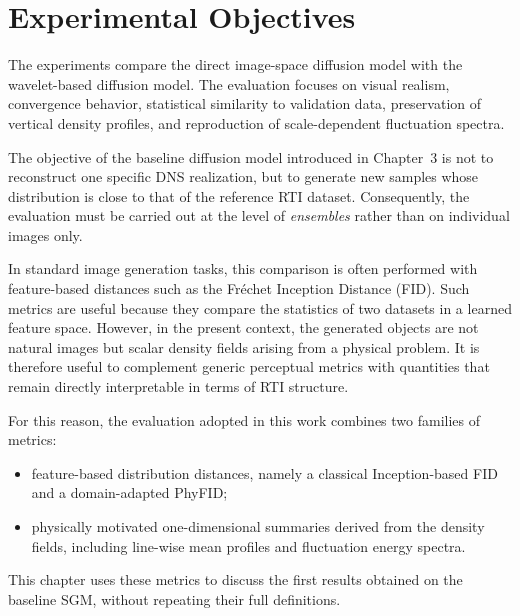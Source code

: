 \section{Experimental Objectives}

The experiments compare the direct image-space diffusion model with the wavelet-based diffusion model. The evaluation focuses on visual realism, convergence behavior, statistical similarity to validation data, preservation of vertical density profiles, and reproduction of scale-dependent fluctuation spectra.

The objective of the baseline diffusion model introduced in Chapter~3 is not to
reconstruct one specific DNS realization, but to generate new samples whose
distribution is close to that of the reference RTI dataset. Consequently, the
evaluation must be carried out at the level of \emph{ensembles} rather than on
individual images only.

In standard image generation tasks, this comparison is often performed with
feature-based distances such as the Fr\'echet Inception Distance (FID). Such
metrics are useful because they compare the statistics of two datasets in a
learned feature space. However, in the present context, the generated objects
are not natural images but scalar density fields arising from a physical
problem. It is therefore useful to complement generic perceptual metrics with
quantities that remain directly interpretable in terms of RTI structure.

For this reason, the evaluation adopted in this work combines two families of
metrics:

\begin{itemize}
    \item feature-based distribution distances, namely a classical
    Inception-based FID and a domain-adapted PhyFID;
    \item physically motivated one-dimensional summaries derived from the
    density fields, including line-wise mean profiles and fluctuation energy
    spectra.
\end{itemize}

This chapter uses these metrics to discuss the first results obtained on the
baseline SGM, without repeating their full definitions.
